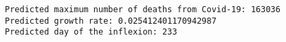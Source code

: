 \documentclass[11pt]{article}
\makeatletter
\newcommand{\boxspacing}{\kern\kvtcb@left@rule\kern\kvtcb@boxsep}
\newcommand{\prompt}[4]{
        \ttfamily\llap{{\color{#2}[#3]:\hspace{3pt}#4}}\vspace{-\baselineskip}
    }
\makeatother
\begin{document}
    \begin{Verbatim}[commandchars=\\\{\}]
Predicted maximum number of deaths from Covid-19: 163036
Predicted growth rate: 0.025412401170942987
Predicted day of the inflexion: 233
    \end{Verbatim}

    
    
    \begin{tcolorbox}[breakable, size=fbox, boxrule=1pt, pad at break*=1mm,colback=cellbackground, colframe=cellborder]
\prompt{In}{incolor}{ }{\boxspacing}
\begin{Verbatim}[commandchars=\\\{\}]

\end{Verbatim}
\end{tcolorbox}


    
    
    
\end{document}
